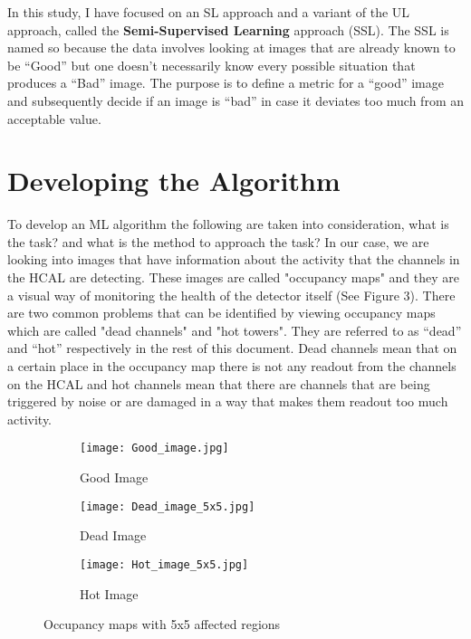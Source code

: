 In this study, I have focused on an SL approach and a variant of the UL approach, called the \textbf{Semi-Supervised Learning} approach (SSL). The SSL is named so because the data involves looking at images that are already known to be “Good” but one doesn’t necessarily know every possible situation that produces a “Bad” image. The purpose is to define a metric for a “good” image and subsequently decide if an image is “bad” in case it deviates too much from an acceptable value.



\section{Developing the Algorithm}

To develop an ML algorithm the following are taken into consideration, what is the task? and what is the method to approach the task? In our case, we are looking into images that have information about the activity that the channels in the HCAL are detecting. These images are called "occupancy maps" and they are a visual way of monitoring the health of the detector itself (See Figure 3). There are two common problems that can be identified by viewing occupancy maps which are called "dead channels" and "hot towers". They are referred to as “dead” and “hot” respectively in the rest of this document. Dead channels mean that on a certain place in the occupancy map there is not any readout from the channels on the HCAL and hot channels mean that there are channels that are being triggered by noise or are damaged in a way that makes them readout too much activity.

\begin{figure}[h]
\begin{subfigure}{.3\textwidth}
	\centering
	\texttt{[image: Good\_image.jpg]}
	\caption{Good Image\label{Goodimage}}
\end{subfigure}
%
\begin{subfigure}{.3\linewidth}
	\centering
	\texttt{[image: Dead\_image\_5x5.jpg]}
	\caption{Dead Image \label{Deadimage}}
\end{subfigure}
%
\begin{subfigure}{0.3\linewidth}
	\centering
	\texttt{[image: Hot\_image\_5x5.jpg]}
	\caption{Hot Image \label{Hotimage}}
\end{subfigure}
\vspace{1cm}
\caption{Occupancy maps with 5x5 affected regions \label{Occupancymaps5x5}}
\end{figure}

